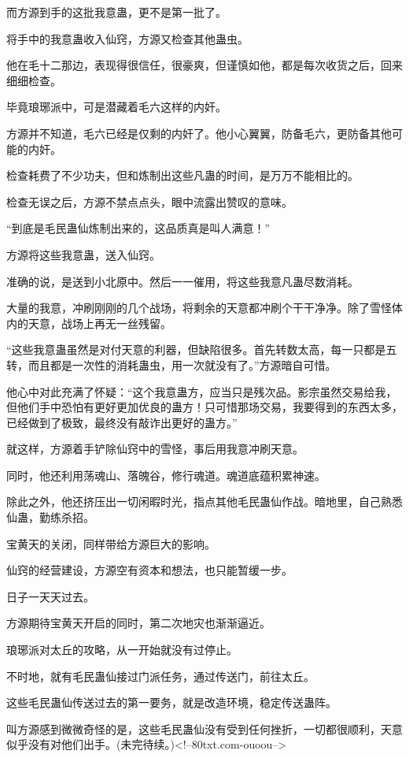 \begin{this_body}
而方源到手的这批我意蛊，更不是第一批了。

将手中的我意蛊收入仙窍，方源又检查其他蛊虫。

他在毛十二那边，表现得很信任，很豪爽，但谨慎如他，都是每次收货之后，回来细细检查。

毕竟琅琊派中，可是潜藏着毛六这样的内奸。

方源并不知道，毛六已经是仅剩的内奸了。他小心翼翼，防备毛六，更防备其他可能的内奸。

检查耗费了不少功夫，但和炼制出这些凡蛊的时间，是万万不能相比的。

检查无误之后，方源不禁点点头，眼中流露出赞叹的意味。

“到底是毛民蛊仙炼制出来的，这品质真是叫人满意！”

方源将这些我意蛊，送入仙窍。

准确的说，是送到小北原中。然后一一催用，将这些我意凡蛊尽数消耗。

大量的我意，冲刷刚刚的几个战场，将剩余的天意都冲刷个干干净净。除了雪怪体内的天意，战场上再无一丝残留。

“这些我意蛊虽然是对付天意的利器，但缺陷很多。首先转数太高，每一只都是五转，而且都是一次性的消耗蛊虫，用一次就没有了。”方源暗自可惜。

他心中对此充满了怀疑：“这个我意蛊方，应当只是残次品。影宗虽然交易给我，但他们手中恐怕有更好更加优良的蛊方！只可惜那场交易，我要得到的东西太多，已经做到了极致，最终没有敲诈出更好的蛊方。”

就这样，方源着手铲除仙窍中的雪怪，事后用我意冲刷天意。

同时，他还利用荡魂山、落魄谷，修行魂道。魂道底蕴积累神速。

除此之外，他还挤压出一切闲暇时光，指点其他毛民蛊仙作战。暗地里，自己熟悉仙蛊，勤练杀招。

宝黄天的关闭，同样带给方源巨大的影响。

仙窍的经营建设，方源空有资本和想法，也只能暂缓一步。

日子一天天过去。

方源期待宝黄天开启的同时，第二次地灾也渐渐逼近。

琅琊派对太丘的攻略，从一开始就没有过停止。

不时地，就有毛民蛊仙接过门派任务，通过传送门，前往太丘。

这些毛民蛊仙传送过去的第一要务，就是改造环境，稳定传送蛊阵。

叫方源感到微微奇怪的是，这些毛民蛊仙没有受到任何挫折，一切都很顺利，天意似乎没有对他们出手。(未完待续。)<!--80txt.com-ouoou-->

\end{this_body}

